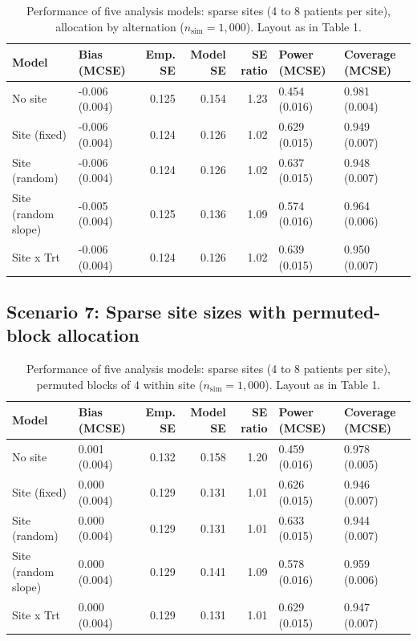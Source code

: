 \documentclass[
  11pt,
]{article}
\begin{document}
\begin{table}[!h]
\centering
\caption{\label{tab:tab-sparse}Performance of five analysis models: sparse sites (4 to 8 patients per site), allocation by alternation ($n_{\mathrm{sim}} = 1{,}000$). Layout as in Table 1.}
\centering
\fontsize{8}{10}\selectfont
\begin{tabular}[t]{llrrrll}
\toprule
Model & Bias (MCSE) & Emp. SE & Model SE & SE ratio & Power (MCSE) & Coverage (MCSE)\\
\midrule
No site & -0.006 (0.004) & 0.125 & 0.154 & 1.23 & 0.454 (0.016) & 0.981 (0.004)\\
Site (fixed) & -0.006 (0.004) & 0.124 & 0.126 & 1.02 & 0.629 (0.015) & 0.949 (0.007)\\
Site (random) & -0.006 (0.004) & 0.124 & 0.126 & 1.02 & 0.637 (0.015) & 0.948 (0.007)\\
Site (random slope) & -0.005 (0.004) & 0.125 & 0.136 & 1.09 & 0.574 (0.016) & 0.964 (0.006)\\
Site x Trt & -0.006 (0.004) & 0.124 & 0.126 & 1.02 & 0.639 (0.015) & 0.950 (0.007)\\
\bottomrule
\end{tabular}
\end{table}

\subsection{Scenario 7: Sparse site sizes with permuted-block allocation}\label{scenario-7-sparse-site-sizes-with-permuted-block-allocation}

\begin{table}[!h]
\centering
\caption{\label{tab:tab-sparse-block}Performance of five analysis models: sparse sites (4 to 8 patients per site), permuted blocks of 4 within site ($n_{\mathrm{sim}} = 1{,}000$). Layout as in Table 1.}
\centering
\fontsize{8}{10}\selectfont
\begin{tabular}[t]{llrrrll}
\toprule
Model & Bias (MCSE) & Emp. SE & Model SE & SE ratio & Power (MCSE) & Coverage (MCSE)\\
\midrule
No site & 0.001 (0.004) & 0.132 & 0.158 & 1.20 & 0.459 (0.016) & 0.978 (0.005)\\
Site (fixed) & 0.000 (0.004) & 0.129 & 0.131 & 1.01 & 0.626 (0.015) & 0.946 (0.007)\\
Site (random) & 0.000 (0.004) & 0.129 & 0.131 & 1.01 & 0.633 (0.015) & 0.944 (0.007)\\
Site (random slope) & 0.000 (0.004) & 0.129 & 0.141 & 1.09 & 0.578 (0.016) & 0.959 (0.006)\\
Site x Trt & 0.000 (0.004) & 0.129 & 0.131 & 1.01 & 0.629 (0.015) & 0.947 (0.007)\\
\bottomrule
\end{tabular}
\end{table}
\end{document}
